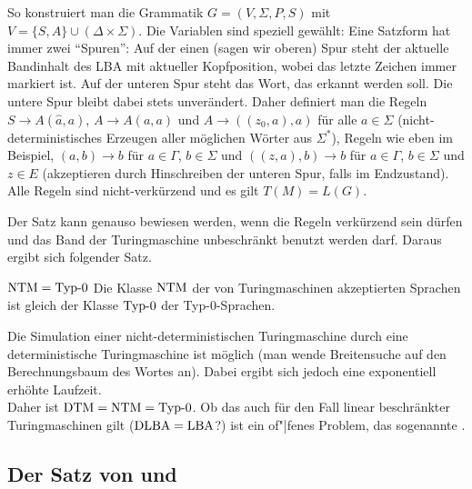 \begin{Beweis}
    So konstruiert man die Grammatik $G = (V, \Sigma, P, S)$ mit
    $V = \{S, A\} \cup (\Delta \times \Sigma)$.
    Die Variablen sind speziell gewählt:
    Eine Satzform hat immer zwei "`Spuren"':
    Auf der einen (sagen wir oberen) Spur steht der aktuelle Bandinhalt des
    LBA mit aktueller Kopfposition, wobei das letzte Zeichen immer markiert
    ist.
    Auf der unteren Spur steht das Wort, das erkannt werden soll.
    Die untere Spur bleibt dabei stets unverändert.
    Daher definiert man die Regeln $S \rightarrow A (\widehat{a}, a)$,
    $A \rightarrow A (a, a)$ und
    $A \rightarrow ((z_0, a), a)$ für alle $a \in \Sigma$
    (nicht-deterministisches Erzeugen aller
    möglichen Wörter aus $\Sigma^\ast$),
    Regeln wie eben im Beispiel,
    $(a, b) \rightarrow b$ für $a \in \Gamma$, $b \in \Sigma$ und
    $((z, a), b) \rightarrow b$ für $a \in \Gamma$, $b \in \Sigma$ und
    $z \in E$
    (akzeptieren durch Hinschreiben der unteren Spur, falls im Endzustand).\\
    Alle Regeln sind nicht-verkürzend und es gilt $T(M) = L(G)$.
\end{Beweis}

\linie
\pagebreak

\begin{Bem}
    Der Satz kann genauso bewiesen werden, wenn die Regeln verkürzend sein
    dürfen und das Band der Turingmaschine unbeschränkt benutzt werden darf.
    Daraus ergibt sich folgender Satz.
\end{Bem}

\begin{Satz}{$\text{NTM} = \text{Typ-0}$}
    Die Klasse $\text{NTM}$ der von Turingmaschinen akzeptierten Sprachen
    ist gleich der Klasse $\text{Typ-0}$ der Typ-0-Sprachen.
\end{Satz}

\begin{Bem}
    Die Simulation einer nicht-deterministischen Turingmaschine durch
    eine deterministische Turingmaschine ist möglich
    (man wende Breitensuche auf den Berechnungsbaum des Wortes an).
    Dabei ergibt sich jedoch eine exponentiell erhöhte Laufzeit.\\
    Daher ist $\text{DTM} = \text{NTM} = \text{Typ-0}$.
    Ob das auch für den Fall linear beschränkter Turingmaschinen gilt
    ($\text{DLBA} = \text{LBA}$?) ist ein of"|fenes Problem, das sogenannte
    .
\end{Bem}

\subsection{%
    Der Satz von  und %
}

